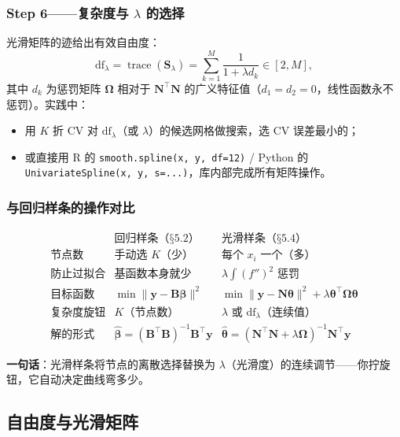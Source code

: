 \subsubsection{Step 6——复杂度与 $\lambda$ 的选择}

光滑矩阵的迹给出有效自由度：
\[
\mathrm{df}_\lambda = \operatorname{trace}(\mathbf{S}_\lambda) = \sum_{k=1}^{M} \frac{1}{1 + \lambda d_k} \in [2, M],
\]
其中 $d_k$ 为惩罚矩阵 $\boldsymbol{\Omega}$ 相对于 $\mathbf{N}^\top\mathbf{N}$ 的广义特征值（$d_1=d_2=0$，线性函数永不惩罚）。实践中：
\begin{itemize}
    \item 用 $K$ 折 CV 对 $\mathrm{df}_\lambda$（或 $\lambda$）的候选网格做搜索，选 CV 误差最小的；
    \item 或直接用 R 的 \texttt{smooth.spline(x, y, df=12)} / Python 的 \texttt{UnivariateSpline(x, y, s=...)}，库内部完成所有矩阵操作。
\end{itemize}

\subsubsection{与回归样条的操作对比}

\[
\begin{array}{c|c|c}
& \text{回归样条（§5.2）} & \text{光滑样条（§5.4）} \\ \hline
\text{节点数} & \text{手动选 } K \text{（少）} & \text{每个 } x_i \text{ 一个（多）} \\
\text{防止过拟合} & \text{基函数本身就少} & \lambda\int(f'')^2 \text{ 惩罚} \\
\text{目标函数} & \min\|\mathbf{y} - \mathbf{B}\boldsymbol{\beta}\|^2 & \min\|\mathbf{y} - \mathbf{N}\boldsymbol{\theta}\|^2 + \lambda\boldsymbol{\theta}^\top\boldsymbol{\Omega}\boldsymbol{\theta} \\
\text{复杂度旋钮} & K \text{（节点数）} & \lambda \text{ 或 } \mathrm{df}_\lambda \text{（连续值）} \\
\text{解的形式} & \hat{\boldsymbol{\beta}} = (\mathbf{B}^\top\mathbf{B})^{-1}\mathbf{B}^\top\mathbf{y} & \hat{\boldsymbol{\theta}} = (\mathbf{N}^\top\mathbf{N} + \lambda\boldsymbol{\Omega})^{-1}\mathbf{N}^\top\mathbf{y}
\end{array}
\]

\textbf{一句话}：光滑样条将节点的离散选择替换为 $\lambda$（光滑度）的连续调节——你拧旋钮，它自动决定曲线弯多少。


\subsection{自由度与光滑矩阵}

